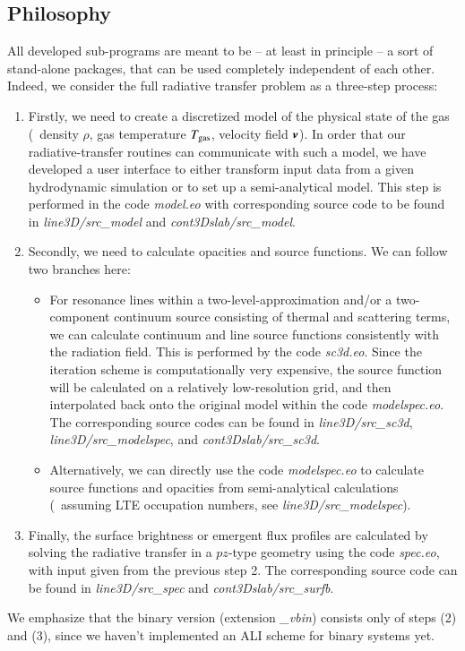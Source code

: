 \documentclass[10pt,a4paper]{article}
\begin{document}
\subsection{Philosophy}
All developed sub-programs are meant to be -- at least in
principle -- a sort of stand-alone packages, that can be used
completely independent of each other. Indeed, we consider the full
radiative transfer problem as a three-step process:
\begin{enumerate}
\item Firstly, we need to create a discretized model of the physical
  state of the gas (\ie~density $\rho$, gas temperature $T_{\rm gas}$, velocity
  field $\boldsymbol{v}$). In order that our radiative-transfer routines
  can communicate with such a model, we have developed a user
  interface to either transform input data from a given hydrodynamic
  simulation or to set up a semi-analytical model. This step
  is performed in the code \textit{model.eo} with corresponding source
  code to be found in \textit{line3D/src\_model} and
  \textit{cont3Dslab/src\_model}.
  \item Secondly, we need to calculate opacities and source functions. We can follow two branches here:
    \begin{itemize}
    \item For resonance lines within a two-level-approximation and/or a two-component continuum source consisting of thermal and scattering terms, we can
      calculate continuum and line source functions consistently with
      the radiation field. This is performed by the code
      \textit{sc3d.eo}. Since the iteration scheme is computationally
      very expensive, the source function will be calculated on a
      relatively low-resolution grid, and then interpolated back onto the original model within the code \textit{modelspec.eo}.
      The corresponding source codes can be found in
      \textit{line3D/src\_sc3d}, \textit{line3D/src\_modelspec}, and
      \textit{cont3Dslab/src\_sc3d}.
      \item Alternatively, we can directly use the code
        \textit{modelspec.eo} to calculate source functions and
        opacities from semi-analytical calculations (\eg~assuming LTE occupation numbers, see \textit{line3D/src\_modelspec}).
    \end{itemize}
  \item Finally, the surface brightness or emergent flux profiles are
    calculated by solving the radiative transfer in a $pz$-type
    geometry using the code \textit{spec.eo}, with input given from
    the previous step 2. The corresponding source code can be found in
    \textit{line3D/src\_spec} and \textit{cont3Dslab/src\_surfb}.
\end{enumerate}
%
We emphasize that the binary version (extension \textit{\_vbin})
consists only of steps (2) and (3), since we haven't implemented an
ALI scheme for binary systems yet.
\end{document}
